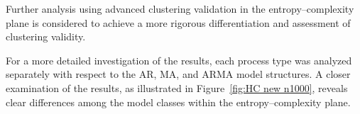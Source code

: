 \documentclass[12pt,a4paper]{article}
\begin{document}



	


Further analysis using advanced clustering validation in the entropy–complexity plane is considered to achieve a more rigorous differentiation and assessment of clustering validity.

For a more detailed investigation of the results, each process type was analyzed separately with respect to the AR, MA, and ARMA model structures. A closer examination of the results, as illustrated in Figure~\ref{fig:HC new n1000}, reveals clear differences among the model classes within the entropy–complexity plane.

\end{document}
